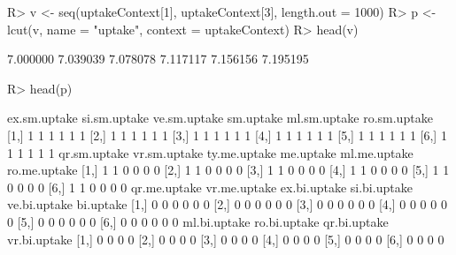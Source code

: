 \begin{Schunk}
% --begin: "pbld5"
\begin{Sinput}
R> v <- seq(uptakeContext[1], uptakeContext[3], length.out = 1000)
R> p <- lcut(v, name = "uptake", context = uptakeContext)
R> head(v)
\end{Sinput}
\begin{Soutput}
[1] 7.000000 7.039039 7.078078 7.117117 7.156156 7.195195
\end{Soutput}
\begin{Sinput}
R> head(p)
\end{Sinput}
\begin{Soutput}
     ex.sm.uptake si.sm.uptake ve.sm.uptake sm.uptake ml.sm.uptake ro.sm.uptake
[1,]            1            1            1         1            1            1
[2,]            1            1            1         1            1            1
[3,]            1            1            1         1            1            1
[4,]            1            1            1         1            1            1
[5,]            1            1            1         1            1            1
[6,]            1            1            1         1            1            1
     qr.sm.uptake vr.sm.uptake ty.me.uptake me.uptake ml.me.uptake ro.me.uptake
[1,]            1            1            0         0            0            0
[2,]            1            1            0         0            0            0
[3,]            1            1            0         0            0            0
[4,]            1            1            0         0            0            0
[5,]            1            1            0         0            0            0
[6,]            1            1            0         0            0            0
     qr.me.uptake vr.me.uptake ex.bi.uptake si.bi.uptake ve.bi.uptake bi.uptake
[1,]            0            0            0            0            0         0
[2,]            0            0            0            0            0         0
[3,]            0            0            0            0            0         0
[4,]            0            0            0            0            0         0
[5,]            0            0            0            0            0         0
[6,]            0            0            0            0            0         0
     ml.bi.uptake ro.bi.uptake qr.bi.uptake vr.bi.uptake
[1,]            0            0            0            0
[2,]            0            0            0            0
[3,]            0            0            0            0
[4,]            0            0            0            0
[5,]            0            0            0            0
[6,]            0            0            0            0
\end{Soutput}
%
% --end: "pbld5"
\end{Schunk}
